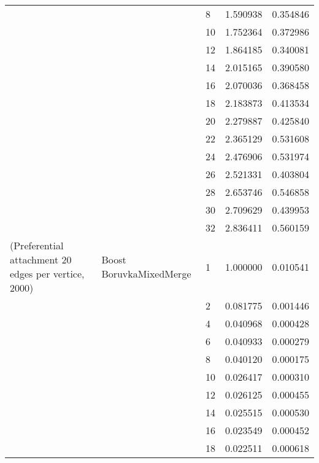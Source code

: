 \begin{tabular}{lllrr}
                      &                     & 8  &  1.590938 &  0.354846 \\
                      &                     & 10 &  1.752364 &  0.372986 \\
                      &                     & 12 &  1.864185 &  0.340081 \\
                      &                     & 14 &  2.015165 &  0.390580 \\
                      &                     & 16 &  2.070036 &  0.368458 \\
                      &                     & 18 &  2.183873 &  0.413534 \\
                      &                     & 20 &  2.279887 &  0.425840 \\
                      &                     & 22 &  2.365129 &  0.531608 \\
                      &                     & 24 &  2.476906 &  0.531974 \\
                      &                     & 26 &  2.521331 &  0.403804 \\
                      &                     & 28 &  2.653746 &  0.546858 \\
                      &                     & 30 &  2.709629 &  0.439953 \\
                      &                     & 32 &  2.836411 &  0.560159 \\
(Preferential attachment 20 edges per vertice, 2000) & Boost BoruvkaMixedMerge & 1  &  1.000000 &  0.010541 \\
                      &                     & 2  &  0.081775 &  0.001446 \\
                      &                     & 4  &  0.040968 &  0.000428 \\
                      &                     & 6  &  0.040933 &  0.000279 \\
                      &                     & 8  &  0.040120 &  0.000175 \\
                      &                     & 10 &  0.026417 &  0.000310 \\
                      &                     & 12 &  0.026125 &  0.000455 \\
                      &                     & 14 &  0.025515 &  0.000530 \\
                      &                     & 16 &  0.023549 &  0.000452 \\
                      &                     & 18 &  0.022511 &  0.000618 \\

\end{tabular}
